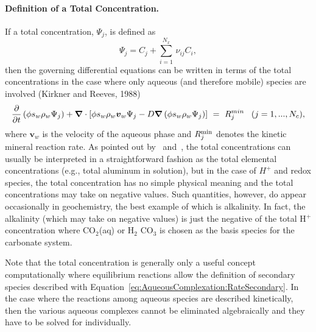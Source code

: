 \paragraph{Definition of a Total Concentration.}
\noindent If a total concentration, $\Psi_{j} $, is defined as~\citep{reed_1982, lichtner_1985, kirkner_1988} 
\begin{equation} \label{eq:AqueousComplexation_GrindEQ__12} 
  \Psi_{j} =C_{j} +\sum _{i=1}^{N_{x} } \, \nu _{ij} C_{i} , 
\end{equation} 
then the governing differential equations can be written in terms of the total concentrations in the case where only aqueous (and therefore mobile) species are involved (Kirkner and Reeves, 1988) 
\begin{equation} \label{eq:AqueousComplexation_GrindEQ__13} 
  \frac{\partial }{\partial t} \left( \phi s_w \rho _{w}  \Psi_{j} \right) 
  + 
  \boldsymbol{\nabla} \cdot \left[ \phi s_w \rho _{w} \boldsymbol{v}_w \Psi_{j} -D\boldsymbol{\nabla} 
  \left( \phi s_w \rho_{w}  \Psi_{j} \right) \right] \ =\  R_{j}^{min} \; \; \; (j=1,...,N_{c} ),
\end{equation} 
where $\boldsymbol{v}_w$ is the velocity of the aqueous phase and $R_j^{\rm min}$ denotes the kinetic mineral reaction rate.
As pointed out by~\citet{reed_1982} and~\citet{lichtner_1985}, the total concentrations can usually be interpreted in a straightforward fashion as the total elemental concentrations (e.g., total aluminum in solution), but in the case of $H^{+} $ and redox species, the total concentration has no simple physical meaning and the total concentrations may take on negative values. Such quantities, however, do appear occasionally in geochemistry, the best example of which is alkalinity. In fact, the alkalinity (which may take on negative values) is just the negative of the total H$^{+} $ concentration where CO$_{2}$(aq) or H$_{2}$ CO$_{3}$ is chosen as the basis species for the carbonate system. 

Note that the total concentration is generally only a useful concept computationally where equilibrium reactions allow the definition of secondary species described with Equation~\eqref{eq:AqueousComplexation:RateSecondary}.  In the case where the reactions among aqueous species are described kinetically, then the various aqueous complexes cannot be eliminated algebraically and they have to be solved for individually.

